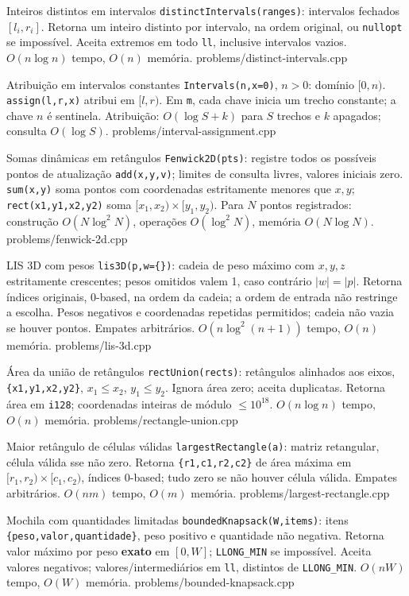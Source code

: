 \templateentry
{Inteiros distintos em intervalos}
{}
{\texttt{distinctIntervals(ranges)}: intervalos fechados $[l_i,r_i]$. Retorna um inteiro distinto por intervalo, na ordem original, ou \texttt{nullopt} se impossível. Aceita extremos em todo \texttt{ll}, inclusive intervalos vazios. $O(n\log n)$ tempo, $O(n)$ memória.}
{problems/distinct-intervals.cpp}

\templateentry
{Atribuição em intervalos constantes}
{}
{\texttt{Intervals(n,x=0)}, $n>0$: domínio $[0,n)$. \texttt{assign(l,r,x)} atribui em $[l,r)$. Em \texttt{m}, cada chave inicia um trecho constante; a chave $n$ é sentinela. Atribuição: $O(\log S+k)$ para $S$ trechos e $k$ apagados; consulta $O(\log S)$.}
{problems/interval-assignment.cpp}

\templateentry
{Somas dinâmicas em retângulos}
{}
{\texttt{Fenwick2D(pts)}: registre todos os possíveis pontos de atualização \texttt{add(x,y,v)}; limites de consulta livres, valores iniciais zero. \texttt{sum(x,y)} soma pontos com coordenadas estritamente menores que $x,y$; \texttt{rect(x1,y1,x2,y2)} soma $[x_1,x_2)\times[y_1,y_2)$. Para $N$ pontos registrados: construção $O(N\log^2N)$, operações $O(\log^2N)$, memória $O(N\log N)$.}
{problems/fenwick-2d.cpp}

\templateentry
{LIS 3D com pesos}
{}
{\texttt{lis3D(p,w=\{\})}: cadeia de peso máximo com $x,y,z$ estritamente crescentes; pesos omitidos valem 1, caso contrário $|w|=|p|$. Retorna índices originais, 0-based, na ordem da cadeia; a ordem de entrada não restringe a escolha. Pesos negativos e coordenadas repetidas permitidos; cadeia não vazia se houver pontos. Empates arbitrários. $O(n\log^2(n+1))$ tempo, $O(n)$ memória.}
{problems/lis-3d.cpp}

\templateentry
{Área da união de retângulos}
{}
{\texttt{rectUnion(rects)}: retângulos alinhados aos eixos, \texttt{\{x1,y1,x2,y2\}}, $x_1\le x_2$, $y_1\le y_2$. Ignora área zero; aceita duplicatas. Retorna área em \texttt{i128}; coordenadas inteiras de módulo $\le10^{18}$. $O(n\log n)$ tempo, $O(n)$ memória.}
{problems/rectangle-union.cpp}

\templateentry
{Maior retângulo de células válidas}
{}
{\texttt{largestRectangle(a)}: matriz retangular, célula válida sse não zero. Retorna \texttt{\{r1,c1,r2,c2\}} de área máxima em $[r_1,r_2)\times[c_1,c_2)$, índices 0-based; tudo zero se não houver célula válida. Empates arbitrários. $O(nm)$ tempo, $O(m)$ memória.}
{problems/largest-rectangle.cpp}

\templateentry
{Mochila com quantidades limitadas}
{}
{\texttt{boundedKnapsack(W,items)}: itens \texttt{\{peso,\allowbreak valor,\allowbreak quantidade\}}, peso positivo e quantidade não negativa. Retorna valor máximo por peso \textbf{exato} em $[0,W]$; \texttt{LLONG\_MIN} se impossível. Aceita valores negativos; valores/intermediários em \texttt{ll}, distintos de \texttt{LLONG\_MIN}. $O(nW)$ tempo, $O(W)$ memória.}
{problems/bounded-knapsack.cpp}


